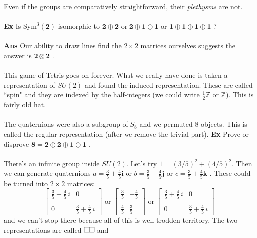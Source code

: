\documentclass[12pt]{article}
\begin{document}
Even if the groups are comparatively straightforward, their \textit{plethysms}  are not.  \\ \\
\textbf{Ex} Is $\text{Sym}^3(\mathbf{2})$ isomorphic to $\mathbf{2} \oplus \mathbf{2}$ or $\mathbf{2} \oplus \mathbf{1} \oplus \mathbf{1}$ or $\mathbf{1} \oplus \mathbf{1} \oplus \mathbf{1} \oplus \mathbf{1}$ ? \\ \\
\textbf{Ans} Our ability to draw lines find the $2 \times 2$ matrices ourselves suggests the answer is  $\boxed{\mathbf{2} \otimes \mathbf{2}}$ . \\ \\
This game of Tetris goes on forever.  What we really have done is taken a representation of $SU(2)$ and found the induced representation.  These are called ``spin" and they are indexed by the half-integers (we could write $\frac{1}{2}\mathbb{Z}$ or $\mathbb{Z}$).  This is fairly old hat. \\ \\
The quaternions were also a subgroup of $S_8$ and we permuted $8$ objects.  This is called the regular representation (after we remove the trivial part). \hfill \textbf{Ex} Prove or disprove $\mathbf{8} = \mathbf{2} \oplus \mathbf{2} \oplus \mathbf{1} \oplus \mathbf{1} $ . \\ \\
There's an infinite group inside $SU(2)$.  Let's try $1 = (3/5)^2 + (4/5)^2$.  Then we can generate quaternions $a = \frac{3}{5} + \frac{4}{5}\mathbf{i} $ or $b = \frac{3}{5} + \frac{4}{5}\mathbf{j} $ or $c = \frac{3}{5} + \frac{4}{5}\mathbf{k} $ . These could be turned into $2 \times 2$ matrices:
$$ \left[
\begin{array}{cc} \frac{3}{5} + \frac{4}{5}\,i & 0 \\ \\
0 & \frac{3}{5} + \frac{4}{5}\, i\end{array} \right] \text{ or }
\left[
\begin{array}{cr} \frac{3}{5}  & -\frac{4}{5} \\ \\
\frac{4}{5} & \frac{3}{5}\end{array} \right] \text{ or }
\left[
\begin{array}{cc} \frac{3}{5} + \frac{4}{5}\,i & 0 \\ \\
0 & \frac{3}{5} + \frac{4}{5}\, i\end{array} \right] $$
and we can't stop there because all of this is well-trodden territory.  The two representations are called $\tikz{\begin{scope}[scale=0.25]\draw (0,0)--(1,0)--(1,1)--(0,1)--cycle;\draw (1,0)--(2,0)--(2,1)--(1,1)--cycle;\end{scope}}$ and 
\end{document}
